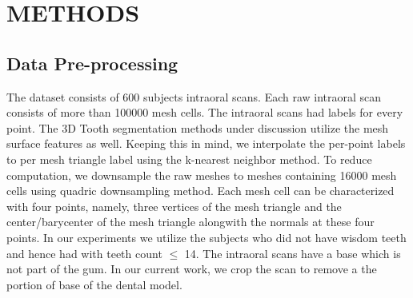 \documentclass[letterpaper, 10 pt, conference]{ieeeconf}  %
\begin{document}


\section{METHODS}
\subsection{Data Pre-processing}
The dataset consists of 600 subjects intraoral scans. Each raw intraoral scan consists of more than 100000 mesh cells. The intraoral scans had labels for every point. The 3D Tooth segmentation methods under discussion utilize the mesh surface features as well. Keeping this in mind, we interpolate the per-point labels to per mesh triangle label using the k-nearest neighbor method.
To reduce computation, we downsample the raw meshes to meshes containing 16000 mesh cells using quadric downsampling method. 
Each mesh cell can be characterized with four points, namely, three vertices of the mesh triangle and the center/barycenter of the mesh triangle alongwith the normals at these four points.
In our experiments we utilize the subjects who did not have wisdom teeth and hence had with teeth count $\leq$ 14.
The intraoral scans have a base which is not part of the gum. In our current work, we crop the scan to remove a the portion of base of the dental model. 
\end{document}

